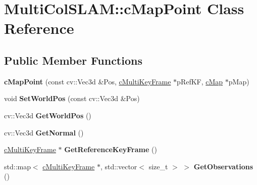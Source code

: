 \hypertarget{classMultiColSLAM_1_1cMapPoint}{}\section{Multi\+Col\+S\+L\+AM\+:\+:c\+Map\+Point Class Reference}
\label{classMultiColSLAM_1_1cMapPoint}
\subsection*{Public Member Functions}
\begin{DoxyCompactItemize}
\item 
{\bfseries c\+Map\+Point} (const cv\+::\+Vec3d \&Pos, \hyperlink{classMultiColSLAM_1_1cMultiKeyFrame}{c\+Multi\+Key\+Frame} $\ast$p\+Ref\+KF, \hyperlink{classMultiColSLAM_1_1cMap}{c\+Map} $\ast$p\+Map)\hypertarget{classMultiColSLAM_1_1cMapPoint_a4f9a13bb03be00a998f8f234411dff06}{}\label{classMultiColSLAM_1_1cMapPoint_a4f9a13bb03be00a998f8f234411dff06}

\item 
void {\bfseries Set\+World\+Pos} (const cv\+::\+Vec3d \&Pos)\hypertarget{classMultiColSLAM_1_1cMapPoint_a47006ca0d6803c37bf28ba18357c85d3}{}\label{classMultiColSLAM_1_1cMapPoint_a47006ca0d6803c37bf28ba18357c85d3}

\item 
cv\+::\+Vec3d {\bfseries Get\+World\+Pos} ()\hypertarget{classMultiColSLAM_1_1cMapPoint_a8b4f0f1df117cef39059307ee7b2d1b6}{}\label{classMultiColSLAM_1_1cMapPoint_a8b4f0f1df117cef39059307ee7b2d1b6}

\item 
cv\+::\+Vec3d {\bfseries Get\+Normal} ()\hypertarget{classMultiColSLAM_1_1cMapPoint_a6b0bbcd7560701d599510209b499f005}{}\label{classMultiColSLAM_1_1cMapPoint_a6b0bbcd7560701d599510209b499f005}

\item 
\hyperlink{classMultiColSLAM_1_1cMultiKeyFrame}{c\+Multi\+Key\+Frame} $\ast$ {\bfseries Get\+Reference\+Key\+Frame} ()\hypertarget{classMultiColSLAM_1_1cMapPoint_ac3573f2d0babad7877e2be2749bf2f52}{}\label{classMultiColSLAM_1_1cMapPoint_ac3573f2d0babad7877e2be2749bf2f52}

\item 
std\+::map$<$ \hyperlink{classMultiColSLAM_1_1cMultiKeyFrame}{c\+Multi\+Key\+Frame} $\ast$, std\+::vector$<$ size\+\_\+t $>$ $>$ {\bfseries Get\+Observations} ()\hypertarget{classMultiColSLAM_1_1cMapPoint_a8d8be86b4a76a648f1a0310a2639919c}{}\label{classMultiColSLAM_1_1cMapPoint_a8d8be86b4a76a648f1a0310a2639919c}


\end{DoxyCompactItemize}
